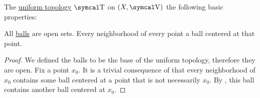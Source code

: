 \begin{proposition}\label{thm:uniform_topology_properties}
  The \hyperref[def:uniform_topology]{uniform topology} \( \CT \) on \( (X, \CV) \) the following basic properties:
  \begin{PropEnum}
     All \hyperref[def:entourage/ball]{balls} are open sets.
     Every neighborhood of every point a ball centered at that point.
  \end{PropEnum}
\end{proposition}
\begin{proof}
   We defined the balls to be the base of the uniform topology, therefore they are open.
   Fix a point \( x_0 \). It is a trivial consequence of  that every neighborhood of \( x_0 \) contains some ball centered at a point that is not necessarily \( x_0 \). By , this ball contains another ball centered at \( x_0 \).
\end{proof}

